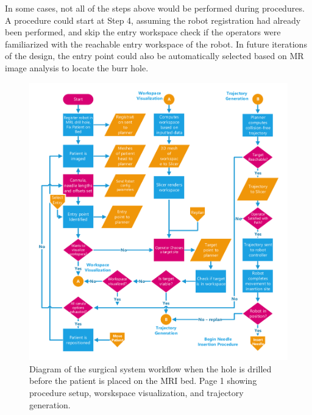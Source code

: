 \documentclass[12pt]{report}
\begin{document}
In some cases, not all of the steps above would be performed during procedures. A procedure could start at Step 4, assuming the robot registration had already been performed, and skip the entry workspace check if the operators were familiarized with the reachable entry workspace of the robot. In future iterations of the design, the entry point could also be automatically selected based on MR image analysis to locate the burr hole.

\begin{figure}[thpb]
	\centering
	\includegraphics[page=1,width=\textwidth]{diagrams/Surgical_Workflow_Hole_Predrilled_V2.pdf}
    \caption{Diagram of the surgical system workflow when the hole is drilled before the patient is placed on the MRI bed. Page 1 showing procedure setup, worskspace visualization, and trajectory generation.}
    \label{fig:surgicalWorkflowPg1}
\end{figure}
\end{document}

